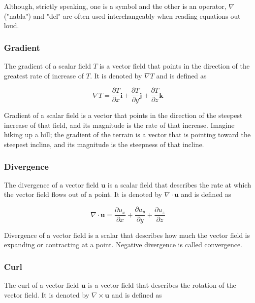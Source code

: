 \documentclass[12pt]{article}
\numberwithin{equation}{section}
\numberwithin{figure}{section}
\numberwithin{table}{section}
\begin{document}
Although, strictly speaking, one is a symbol and the other is an operator,
$\nabla$ ("nabla") and "del" are often used interchangeably when reading equations
out loud.

\subsubsection{Gradient}

The gradient of a scalar field $T$ is a vector field that points in the
direction of the greatest rate of increase of $T$.
It is denoted by $\nabla T$ and is defined as

\begin{equation}
  \nabla T = \frac{\partial T}{\partial x} \mathbf{i} +
    \frac{\partial T}{\partial y} \mathbf{j} +
    \frac{\partial T}{\partial z} \mathbf{k}
  \label{eq:gradient}
\end{equation}

Gradient of a scalar field is a vector that points in the direction of the
steepest increase of that field, and its magnitude is the rate of that increase.
Imagine hiking up a hill; the gradient of the terrain is a vector
that is pointing toward the steepest incline, and its magnitude is the steepness
of that incline.

\subsubsection{Divergence}

The divergence of a vector field $\mathbf{u}$ is a scalar field that describes
the rate at which the vector field flows out of a point.
It is denoted by $\nabla \cdot \mathbf{u}$ and is defined as

\begin{equation}
  \nabla \cdot \mathbf{u} = \frac{\partial u_x}{\partial x} +
    \frac{\partial u_y}{\partial y} + \frac{\partial u_z}{\partial z}
  \label{eq:divergence}
\end{equation}

Divergence of a vector field is a scalar that describes how much the vector
field is expanding or contracting at a point.
Negative divergence is called convergence.

\subsubsection{Curl}

The curl of a vector field $\mathbf{u}$ is a vector field that describes the
rotation of the vector field.
It is denoted by $\nabla \times \mathbf{u}$ and is defined as
\end{document}
